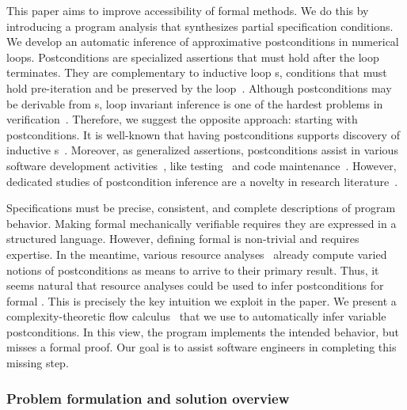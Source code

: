 This paper aims to improve accessibility of formal methods.
We do this by introducing a program analysis that synthesizes partial specification conditions.
We develop an automatic inference of approximative postconditions in numerical loops.
Postconditions are specialized assertions that must hold after the loop terminates.
They are complementary to inductive loop s, \ie conditions that must hold pre-iteration and be preserved by the loop~\cite{sankaranarayanan2004}.
Although postconditions may be derivable from s, loop invariant inference is one of the hardest problems in verification~\cite{dillig2013,si2018}.
Therefore, we suggest the opposite approach: starting with postconditions.
It is well-known that having postconditions supports discovery of inductive s~\cite{furia2010}.
Moreover, as generalized assertions, postconditions assist in various software development activities~\cite{nguyen2022}, like testing~\cite{alagarsamy2024,zhang2015} and code maintenance~\cite{rosenblum1995}.
However, dedicated studies of postcondition inference are a novelty in research literature~\cite{popeea2006,molina2021}.

Specifications must be precise, consistent, and complete descriptions of program behavior.
Making formal  mechanically verifiable requires they are expressed in a structured language.
However, defining formal  is non-trivial and requires expertise.
In the meantime, various resource analyses~\cite{jones2009,brockschmidt2016} already compute varied notions of postconditions as means to arrive to their primary result.
Thus, it seems natural that {resource analyses could be used to infer postconditions} for formal .
This is precisely the key intuition we exploit in the paper.
We present a complexity\hyp{}theoretic flow calculus~\cite{jones2009,aubert20222} that we use to automatically infer variable postconditions.
In this view, the program implements the intended behavior, but misses a formal proof.
Our goal is to assist software engineers in completing this missing step.

\subsubsection{Problem formulation and solution overview}
\label{subsec:overview}

